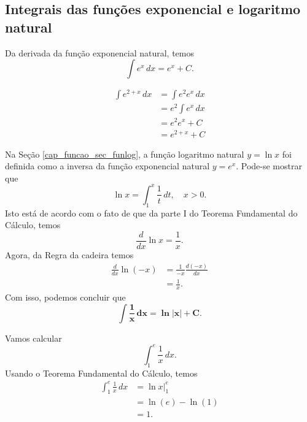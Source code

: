 \subsection{Integrais das funções exponencial e logaritmo natural}

Da derivada da função exponencial natural, temos
\begin{equation}
  \int e^x\,dx = e^x + C.
\end{equation}

\begin{ex}
  \begin{align}
    \int e^{2 + x}\,dx &= \int e^2e^x\,dx \\
                       &= e^2\int e^x\,dx \\
                       &= e^2e^x + C \\
                       &= e^{2+x} + C
  \end{align}
\end{ex}

Na Seção \ref{cap_funcao_sec_funlog}, a função logaritmo natural $y = \ln x$ foi definida como a inversa da função exponencial natural $y = e^x$. Pode-se mostrar que
\begin{equation}
  \ln x = \int_1^x\frac{1}{t}\,dt,\quad x>0.
\end{equation}
Isto está de acordo com o fato de que da parte I do Teorema Fundamental do Cálculo, temos
\begin{equation}
  \frac{d}{dx}\ln x = \frac{1}{x}.
\end{equation}
Agora, da Regra da cadeira temos
\begin{align}
  \frac{d}{dx}\ln(-x) &= \frac{1}{-x}\frac{d(-x)}{dx} \\
                      &= \frac{1}{x}.
\end{align}
Com isso, podemos concluir que
\begin{equation}
  \pmb{\int \frac{1}{x}\,dx = \ln|x| + C}.
\end{equation}

\begin{ex}
  Vamos calcular
  \begin{equation}
    \int_1^e \frac{1}{x}\,dx.
  \end{equation}
  Usando o Teorema Fundamental do Cálculo, temos
  \begin{align}
    \int_1^e \frac{1}{x}\,dx &= \left. \ln x\right|_1^e \\
                             &= \ln(e) - \ln(1) \\
                             &= 1.
  \end{align}
\end{ex}

